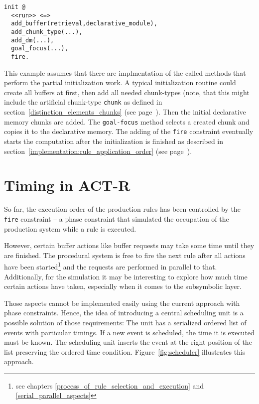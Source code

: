 \begin{lstlisting}
init @ 
  <<run>> <=> 
  add_buffer(retrieval,declarative_module),
  add_chunk_type(...),
  add_dm(...),
  goal_focus(...),
  fire.
\end{lstlisting}

This example assumes that there are implmentation of the called methods that perform the partial initialization work. A typical initialization routine could create all buffers at first, then add all needed chunk-types (note, that this might include the artificial chunk-type \lstinline|chunk| as defined in section~\ref{distinction_elements_chunks} (see page~\pageref{distinction_elements_chunks}). Then the initial declarative memory chunks are added. The \lstinline|goal-focus| method selects a created chunk and copies it to the declarative memory. The adding of the \lstinline|fire| constraint eventually starts the computation after the initialization is finished as described in section~\ref{implementation:rule_application_order} (see page~\pageref{implementation:rule_application_order}).

\section{Timing in ACT-R}

So far, the execution order of the production rules has been controlled by the \lstinline|fire| constraint -- a phase constraint that simulated the occupation of the production system while a rule is executed.

However, certain buffer actions like buffer requests may take some time until they are finished. The procedural system is free to fire the next rule after all actions have been started\footnote{see chapters \ref{process_of_rule_selection_and_execution} and \ref{serial_parallel_aspects}} and the requests are performed in parallel to that. Additionally, for the simulation it may be interesting to explore how much time certain actions have taken, especially when it comes to the subsymbolic layer.

Those aspects cannot be implemented easily using the current approach with phase constraints. Hence, the idea of introducing a central scheduling unit is a possible solution of those requirements: The unit has a serialized ordered list of events with particular timings. If a new event is scheduled, the time it is executed must be known. The scheduling unit inserts the event at the right position of the list preserving the ordered time condition. Figure~\ref{fig:scheduler} illustrates this approach.

